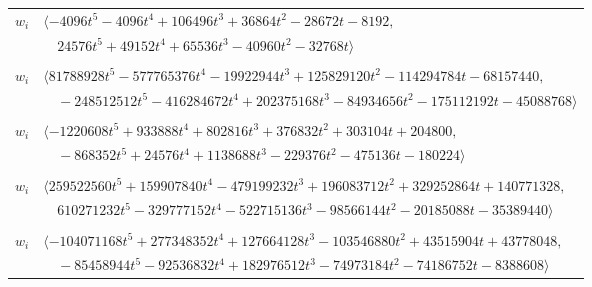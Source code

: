 \documentclass[11pt]{article}
\begin{document}
\begin{longtable}{@{}ll@{}}
$w_i$ & $\langle -4096t^{5}-4096t^{4}+106496t^{3}+36864t^{2}-28672t-8192,$\\
 & $\quad 24576t^{5}+49152t^{4}+65536t^{3}-40960t^{2}-32768t\rangle$\\
\addlinespace[2pt]
\multicolumn{2}{@{}p{0.97\textwidth}@{}}{$i=15$, $D_i=1048576$, $\rho_{ij}$: $0{:}2, \allowbreak 7{:}1, \allowbreak 9{:}2, \allowbreak 10{:}2, \allowbreak 12{:}2, \allowbreak 14{:}1, \allowbreak 16{:}2, \allowbreak 18{:}2, \allowbreak 44{:}2$}\\
$w_i$ & $\langle 81788928t^{5}-577765376t^{4}-19922944t^{3}+125829120t^{2}-114294784t-68157440,$\\
 & $\quad -248512512t^{5}-416284672t^{4}+202375168t^{3}-84934656t^{2}-175112192t-45088768\rangle$\\
\addlinespace[2pt]
\multicolumn{2}{@{}p{0.97\textwidth}@{}}{$i=16$, $D_i=8192$, $\rho_{ij}$: $0{:}1, \allowbreak 10{:}2, \allowbreak 15{:}1, \allowbreak 17{:}1, \allowbreak 20{:}1, \allowbreak 24{:}1, \allowbreak 28{:}2, \allowbreak 29{:}1, \allowbreak 39{:}1, \allowbreak 49{:}1, \allowbreak 52{:}2$}\\
$w_i$ & $\langle -1220608t^{5}+933888t^{4}+802816t^{3}+376832t^{2}+303104t+204800,$\\
 & $\quad -868352t^{5}+24576t^{4}+1138688t^{3}-229376t^{2}-475136t-180224\rangle$\\
\addlinespace[2pt]
\multicolumn{2}{@{}p{0.97\textwidth}@{}}{$i=17$, $D_i=262144$, $\rho_{ij}$: $11{:}1, \allowbreak 16{:}2, \allowbreak 18{:}2, \allowbreak 20{:}2, \allowbreak 28{:}1, \allowbreak 29{:}1, \allowbreak 33{:}2, \allowbreak 40{:}1, \allowbreak 46{:}1, \allowbreak 48{:}2, \allowbreak 52{:}2$}\\
$w_i$ & $\langle 259522560t^{5}+159907840t^{4}-479199232t^{3}+196083712t^{2}+329252864t+140771328,$\\
 & $\quad 610271232t^{5}-329777152t^{4}-522715136t^{3}-98566144t^{2}-20185088t-35389440\rangle$\\
\addlinespace[2pt]
\multicolumn{2}{@{}p{0.97\textwidth}@{}}{$i=18$, $D_i=262144$, $\rho_{ij}$: $0{:}2, \allowbreak 9{:}1, \allowbreak 10{:}1, \allowbreak 12{:}2, \allowbreak 14{:}1, \allowbreak 15{:}1, \allowbreak 17{:}1, \allowbreak 27{:}2, \allowbreak 31{:}1, \allowbreak 34{:}2, \allowbreak 41{:}2, \allowbreak 44{:}1$}\\
$w_i$ & $\langle -104071168t^{5}+277348352t^{4}+127664128t^{3}-103546880t^{2}+43515904t+43778048,$\\
 & $\quad -85458944t^{5}-92536832t^{4}+182976512t^{3}-74973184t^{2}-74186752t-8388608\rangle$\\

\end{longtable}
\end{document}
